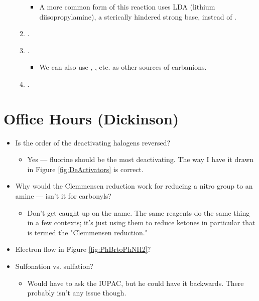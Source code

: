 \documentclass[../notes.tex]{subfiles}
\begin{document}
\begin{itemize}
\begin{enumerate}
        \begin{itemize}
            \item A more common form of this reaction uses LDA (lithium diisopropylamine), a sterically hindered strong base, instead of .
        \end{itemize}
        \item {}.
        \item {}.
        \begin{itemize}
            \item We can also use , , etc. as other sources of carbanions.
        \end{itemize}
        \item {}.
    \end{enumerate}
\end{itemize}



\section{Office Hours (Dickinson)}
\begin{itemize}
    \item Is the order of the deactivating halogens reversed?
    \begin{itemize}
        \item Yes --- fluorine should be the most deactivating. The way I have it drawn in Figure \ref{fig:DeActivators} is correct.
    \end{itemize}
    \item Why would the Clemmensen reduction work for reducing a nitro group to an amine --- isn't it for carbonyls?
    \begin{itemize}
        \item Don't get caught up on the name. The same reagents do the same thing in a few contexts; it's just using them to reduce ketones in particular that is termed the "Clemmensen reduction."
    \end{itemize}
    \item Electron flow in Figure \ref{fig:PhBrtoPhNH2}?
    \item Sulfonation vs. sulfation?
    \begin{itemize}
        \item Would have to ask the IUPAC, but he could have it backwards. There probably isn't any issue though.
    \end{itemize}
\end{itemize}
\end{document}
